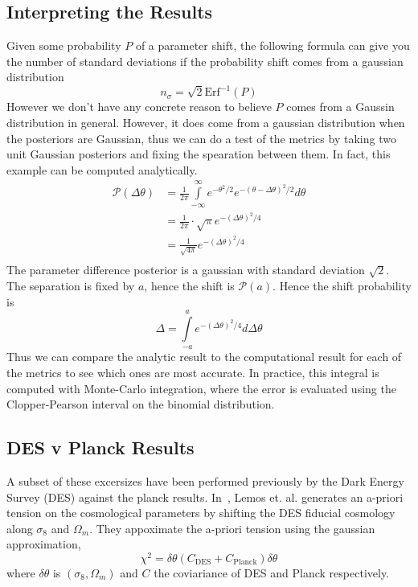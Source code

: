 \subsection{Interpreting the Results}
Given some probability $P$ of a parameter shift, the following formula can give you the number of standard deviations if the probability shift comes from a gaussian distribution
\begin{equation}
	n_\sigma = \sqrt{2} \text{Erf}^{-1}(P)
\end{equation}
However we don't have any concrete reason to believe $P$ comes from a Gaussin distribution in general. However, it does come from a gaussian distribution when the posteriors are Gaussian, thus we can do a test of the metrics by taking two unit Gaussian posteriors and fixing the spearation between them. In fact, this example can be computed analytically.
\begin{equation}
    \begin{split}
	\mathcal{P}(\Delta \theta) &= \frac{1}{2\pi} \int\limits_{-\infty}^{\infty} e^{-\theta^2/2} e^{-{(\theta-\Delta\theta)}^2/2}  d\theta \\
				  			   &= \frac{1}{2\pi} \cdot \sqrt{\pi} e^{-{(\Delta\theta)}^2/4}\\
				   			   &= \frac{1}{\sqrt{4\pi}}e^{-{(\Delta\theta)}^2/4}\\
    \end{split}
\end{equation}
The parameter difference posterior is a gaussian with standard deviation $\sqrt{2}$. The separation is fixed by $a$, hence the shift is $\mathcal{P}(a)$. Hence the shift probability is
\begin{equation}
	\Delta = \int\limits_{-a}^{a} e^{-{(\Delta\theta)}^2/4} d\Delta\theta
\end{equation}
Thus we can compare the analytic result to the computational result for each of the metrics to see which ones are most accurate. In practice, this integral is computed with Monte-Carlo integration, where the error is evaluated using the Clopper-Pearson interval on the binomial distribution.
\subsection{DES v Planck Results}\label{sec:planck_DES_tenion}
A subset of these excersizes have been performed previously by the Dark Energy Survey (DES) against the planck results. In~\cite{lemos_assessing_2021}, Lemos et. al. generates an a-priori tension on the cosmological parameters by shifting the DES fiducial cosmology along $\sigma_8$ and $\Omega_m$. They appoximate the a-priori tension using the gaussian approximation,
\begin{equation}\label{eq:a-priori}
	\chi^2 = \delta\theta (C_\mathrm{DES}+C_\mathrm{Planck})\delta\theta
\end{equation}
where $\delta\theta$ is $(\sigma_8,\Omega_m)$ and $C$ the coviariance of DES and Planck respectively.

